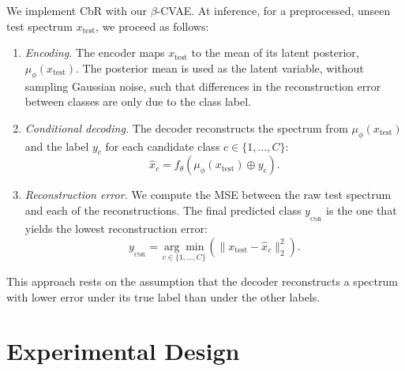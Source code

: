 \documentclass[12pt]{article}
\theoremstyle{paper}
\begin{document}
We implement CbR with our $\beta$-CVAE. At inference, for a preprocessed, unseen test spectrum $x_{\text{test}}$, we proceed as follows:

\begin{enumerate}
    \item \emph{Encoding.} The encoder maps $x_{\text{test}}$ to the mean of its latent posterior, $\mu_\phi(x_{\text{test}})$. The posterior mean is used as the latent variable, without sampling Gaussian noise, such that differences in the reconstruction error between classes are only due to the class label.
    
    \item \emph{Conditional decoding.} The decoder reconstructs the spectrum from $\mu_\phi(x_{\text{test}})$ and the label $y_c$ for each candidate class $c \in \{1, \dots, C\}$: 
    \begin{equation}
        \hat{x}_c = f_\theta(\mu_\phi(x_{\text{test}}) \oplus y_c).
    \end{equation}
    
    \item \emph{Reconstruction error.} We compute the MSE between the raw test spectrum and each of the reconstructions. The final predicted class $y_{_\text{CbR}}$ is the one that yields the lowest reconstruction error:
    \begin{equation}
    y_{_\text{CbR}} = \underset{c \in \{1, \dots, C\}}{\arg \min} \left( \| x_{\text{test}} - \hat{x}_c \|_2^2 \right).
    \end{equation}
\end{enumerate}

This approach rests on the assumption that the decoder reconstructs a spectrum with lower error under its true label than under the other labels.

\section{Experimental Design}
\label{sec:experimental_design}

\end{document}
